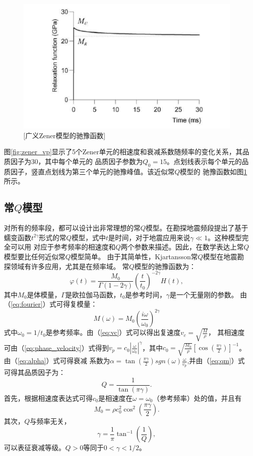 \begin{figure}[!htbp]
	    \centering
		\includegraphics[width=0.7\linewidth]{figure/zener_rela}
		[广义Zener模型的驰豫函数]
		\label{fig:zener_rela}
\end{figure}
图\ref{fig:zener_vp}显示了5个Zener单元的相速度和衰减系数随频率的变化关系，其品质因子为30，其中每个单元的
品质因子参数为$Q_0=15$。点划线表示每个单元的品质因子，竖直点划线为第三个单元的驰豫峰值。该近似常$Q$模型的
驰豫函数如图\ref{fig:zener_rela}所示。


\vspace{0.5cm}
\subsection{常$Q$模型}
\vspace{0.5cm}
对所有的频率段，都可以设计出非常理想的常$Q$模型。在勘探地震频段提出了基于
蠕变函数$t^{2\gamma}$形式的常$Q$模型，式中$t$是时间，对于地震应用来说$\gamma\ll1$。这种模型完全可以用
对应于参考频率的相速度和$Q$两个参数来描述。因此，在数学表达上常$Q$模型要比任何近似常$Q$模型简单。
由于其简单性，Kjartansson常$Q$模型在地震勘探领域有许多应用，尤其是在频率域。
常$Q$模型的驰豫函数为：
\begin{equation}
	\varphi(t)=\frac{M_0}{\Gamma(1-2\gamma)}(\frac{t}{t_0})^{-2\gamma}H(t),
\end{equation}
其中$M_0$是体模量，$\Gamma$是欧拉伽马函数，$t_0$是参考时间，$\gamma$是一个无量刚的参数。
由（\ref{eq:fourier}）式可得复模量：
\begin{equation}
	M(\omega)=M_0(\frac{i\omega}{\omega_0})^{2\gamma}
\end{equation}
式中$\omega_0=1/t_0$是参考频率。由（\ref{eq:vc}）式可以得出复速度$v_c=\sqrt{\frac{M}{\rho}}$，
其相速度可由（\ref{eq:phase_velocity}）式得到$v_p=c_0|\frac{\omega}{\omega_0}|^\gamma$，其中$c_0=
\sqrt{\frac{M_0}{\rho}}[\cos(\frac{\pi\gamma}{2})]^{-1}$。由（\ref{eq:alpha}）式可得衰减
系数为$\alpha=\tan(\frac{\pi\gamma}{2})sgn(\omega)\frac{\omega}{v_p}$,并由（\ref{eq:qm}）式
可得其品质因子为：
\begin{equation}
	Q=\frac{1}{\tan(\pi\gamma)}.
\end{equation}
首先，根据相速度表达式可得$c_0$是相速度在$\omega=\omega_0$（参考频率）处的值，并且有
\begin{equation}
	M_0=\rho c_0^2\cos^2(\frac{\pi\gamma}{2}).
\end{equation}
其次，$Q$与频率无关，
\begin{equation}
	\gamma=\frac{1}{\pi}\tan^{-1}(\frac{1}{Q}),
\end{equation}
可以表征衰减等级。$Q>0$等同于$0<\gamma<1/2$。

